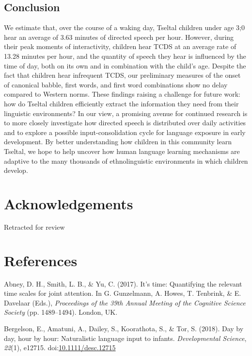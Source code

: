 \documentclass[floatsintext,man]{apa6}
\theoremstyle{definition}
\theoremstyle{definition}
\theoremstyle{definition}
\theoremstyle{remark}
\begin{document}
\subsection{Conclusion}\label{disc-conclusion}

We estimate that, over the course of a waking day, Tseltal children
under age 3;0 hear an average of 3.63 minutes of directed speech per
hour. However, during their peak moments of interactivity, children hear
TCDS at an average rate of 13.28 minutes per hour, and the quantity of
speech they hear is influenced by the time of day, both on its own and
in combination with the child's age. Despite the fact that children hear
infrequent TCDS, our preliminary measures of the onset of canonical
babble, first words, and first word combinations show no delay compared
to Western norms. These findings raising a challenge for future work:
how do Tseltal children efficiently extract the information they need
from their linguistic environments? In our view, a promising avenue for
continued research is to more closely investigate how directed speech is
distributed over daily activities and to explore a possible
input-consolidation cycle for language exposure in early development. By
better understanding how children in this community learn Tseltal, we
hope to help uncover how human language learning mechanisms are adaptive
to the many thousands of ethnolinguistic environments in which children
develop.

\section{Acknowledgements}\label{acknowledgements}

Retracted for review

\newpage

\section{References}\label{refs}

\begingroup
\setlength{\parindent}{-0.5in} \setlength{\leftskip}{0.5in}

\hypertarget{refs}{}
\hypertarget{ref-abney2017time}{}
Abney, D. H., Smith, L. B., \& Yu, C. (2017). It's time: Quantifying the
relevant time scales for joint attention. In G. Gunzelmann, A. Howes, T.
Tenbrink, \& E. Davelaar (Eds.), \emph{Proceedings of the 39th Annual
Meeting of the Cognitive Science Society} (pp. 1489--1494). London, UK.

\hypertarget{ref-bergelson2018day}{}
Bergelson, E., Amatuni, A., Dailey, S., Koorathota, S., \& Tor, S.
(2018). Day by day, hour by hour: Naturalistic language input to
infants. \emph{Developmental Science}, \emph{22}(1), e12715.
doi:\href{https://doi.org/10.1111/desc.12715}{10.1111/desc.12715}
\end{document}
